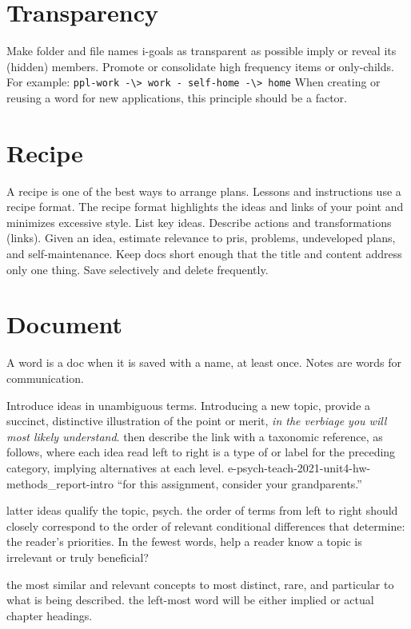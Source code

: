 \documentclass[
]{book}
\begin{document}
\section{Transparency}\label{transparency}

Make folder and file names i-goals as transparent as possible imply or reveal its (hidden) members.
Promote or consolidate high frequency items or only-childs.
For example: \texttt{ppl-work\ -\textbackslash{}\textgreater{}\ work\ -\ self-home\ -\textbackslash{}\textgreater{}\ home}
When creating or reusing a word for new applications, this principle should be a factor.

\section{Recipe}\label{recipe}

A recipe is one of the best ways to arrange plans.
Lessons and instructions use a recipe format.
The recipe format highlights the ideas and links of your point and minimizes excessive style.
List key ideas.
Describe actions and transformations (links).
Given an idea, estimate relevance to pris, problems, undeveloped plans, and self-maintenance.
Keep docs short enough that the title and content address only one thing.
Save selectively and delete frequently.

\section{Document}\label{document}

A word is a doc when it is saved with a name, at least once.
Notes are words for communication.

Introduce ideas in unambiguous terms.
Introducing a new topic, provide a succinct, distinctive illustration of the point or merit, \emph{in the verbiage you will most likely understand}.
then describe the link with a taxonomic reference, as follows, where each idea read left to right is a type of or label for the preceding category, implying alternatives at each level.
e-psych-teach-2021-unit4-hw-methods\_report-intro ``for this assignment, consider your grandparents.''

latter ideas qualify the topic, psych. the order of terms from left to right should closely correspond to the order of relevant conditional differences that determine: the reader's priorities.
In the fewest words, help a reader know a topic is irrelevant or truly beneficial?

the most similar and relevant concepts to most distinct, rare, and particular to what is being described.
the left-most word will be either implied or actual chapter headings.
\end{document}
